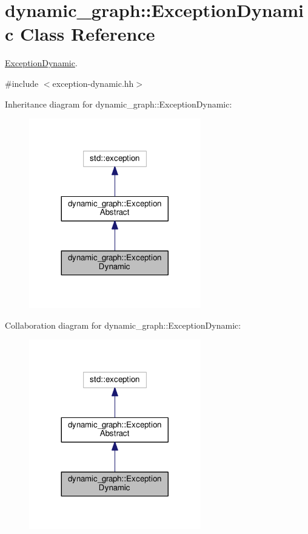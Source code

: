 \hypertarget{classdynamic__graph_1_1ExceptionDynamic}{}\section{dynamic\+\_\+graph\+:\+:Exception\+Dynamic Class Reference}
\label{classdynamic__graph_1_1ExceptionDynamic}


\hyperlink{classdynamic__graph_1_1ExceptionDynamic}{Exception\+Dynamic}.  




{\ttfamily \#include $<$exception-\/dynamic.\+hh$>$}



Inheritance diagram for dynamic\+\_\+graph\+:\+:Exception\+Dynamic\+:\nopagebreak
\begin{figure}[H]
\begin{center}
\leavevmode
\includegraphics[width=212pt]{classdynamic__graph_1_1ExceptionDynamic__inherit__graph}
\end{center}
\end{figure}


Collaboration diagram for dynamic\+\_\+graph\+:\+:Exception\+Dynamic\+:\nopagebreak
\begin{figure}[H]
\begin{center}
\leavevmode
\includegraphics[width=212pt]{classdynamic__graph_1_1ExceptionDynamic__coll__graph}
\end{center}
\end{figure}
